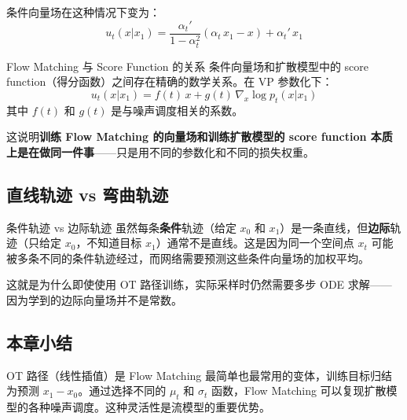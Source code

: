 条件向量场在这种情况下变为：
$$u_t(x | x_1) = \frac{\alpha_t'}{1 - \alpha_t^2} \left( \alpha_t \, x_1 - x \right) + \alpha_t' \, x_1$$

\begin{knowledgebox}{Flow Matching 与 Score Function 的关系}
条件向量场和扩散模型中的 score function（得分函数）之间存在精确的数学关系。在 VP 参数化下：
$$u_t(x | x_1) = f(t) \, x + g(t) \, \nabla_x \log p_t(x | x_1)$$
其中 $f(t)$ 和 $g(t)$ 是与噪声调度相关的系数。

这说明\textbf{训练 Flow Matching 的向量场和训练扩散模型的 score function 本质上是在做同一件事}——只是用不同的参数化和不同的损失权重。
\end{knowledgebox}

\subsection{直线轨迹 vs 弯曲轨迹}

\begin{warningbox}{条件轨迹 vs 边际轨迹}
虽然每条\textbf{条件}轨迹（给定 $x_0$ 和 $x_1$）是一条直线，但\textbf{边际}轨迹（只给定 $x_0$，不知道目标 $x_1$）通常不是直线。这是因为同一个空间点 $x_t$ 可能被多条不同的条件轨迹经过，而网络需要预测这些条件向量场的加权平均。

这就是为什么即使使用 OT 路径训练，实际采样时仍然需要多步 ODE 求解——因为学到的边际向量场并不是常数。
\end{warningbox}

\subsection{本章小结}

OT 路径（线性插值）是 Flow Matching 最简单也最常用的变体，训练目标归结为预测 $x_1 - x_0$。通过选择不同的 $\mu_t$ 和 $\sigma_t$ 函数，Flow Matching 可以复现扩散模型的各种噪声调度。这种灵活性是流模型的重要优势。


